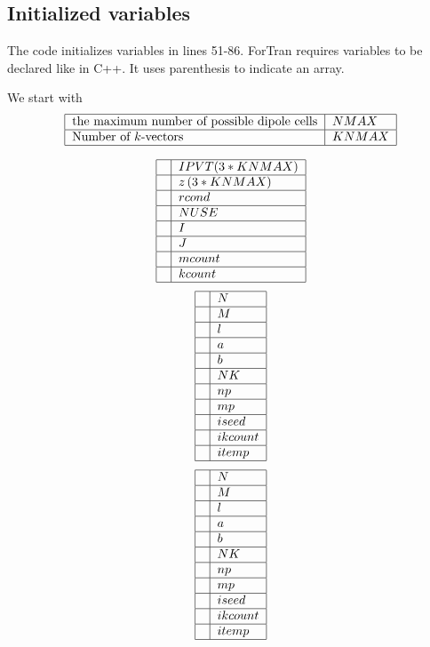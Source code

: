 \documentclass{article}
\begin{document}
\subsection{Initialized variables}

The code initializes variables in lines 51-86. ForTran requires variables to
be declared like in C++. It uses parenthesis to indicate an array.

We start with 
\[
\begin{tabular}{|l|l|}
\hline
the maximum number of possible dipole cells & $NMAX$ \\ \hline
Number of $k$-vectors & $KNMAX$ \\ \hline
\end{tabular}%
\]

\[
\begin{tabular}{|l|l|}
\hline
& $IPVT(3\ast KNMAX)$ \\ \hline
& $z\left( 3\ast KNMAX\right) $ \\ \hline
& $rcond$ \\ \hline
& $NUSE$ \\ \hline
& $I$ \\ \hline
& $J$ \\ \hline
& $mcount$ \\ \hline
& $kcount$ \\ \hline
\end{tabular}%
\]%
\[
\begin{tabular}{|l|l|}
\hline
& $N$ \\ \hline
& $M$ \\ \hline
& $l$ \\ \hline
& $a$ \\ \hline
& $b$ \\ \hline
& $NK$ \\ \hline
& $np$ \\ \hline
& $mp$ \\ \hline
& $iseed$ \\ \hline
& $ikcount$ \\ \hline
& $itemp$ \\ \hline
\end{tabular}%
\]%
\[
\begin{tabular}{|l|l|}
\hline
& $N$ \\ \hline
& $M$ \\ \hline
& $l$ \\ \hline
& $a$ \\ \hline
& $b$ \\ \hline
& $NK$ \\ \hline
& $np$ \\ \hline
& $mp$ \\ \hline
& $iseed$ \\ \hline
& $ikcount$ \\ \hline
& $itemp$ \\ \hline
\end{tabular}%
\]
\end{document}
